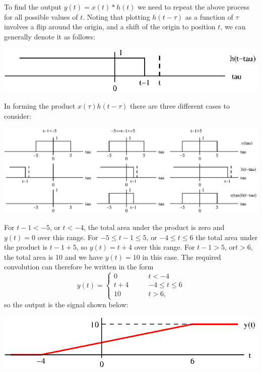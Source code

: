 \documentclass[10pt]{beamer}
\newcommand{\conv}{\ast}
\begin{document}
To find the output $y(t) = x(t) \conv h(t)$ we need to repeat the above process for all possible values of $t$.  Noting that plotting $h(t-\tau)$ as a function of $\tau$ involves a flip around the origin, and a shift of the origin to position $t$, we can generally denote it as follows:
\begin{center}
  \includegraphics{convexample4}
\end{center}
In forming the product $x(\tau) h(t-\tau)$ there are three different cases to consider:
\begin{center}
  \includegraphics{convexample3}
\end{center}
For $t-1<-5$, or $t<-4$, the total area under the product is zero and $y(t)=0$ over this range.  For $-5 \leq t-1 \leq 5$, or $-4 \leq t \leq 6$ the total area under the product is $t-1+5$, so $y(t) = t+4$ over this range.  For $t-1>5$, or$t>6$, the total area is 10 and we have $y(t)=10$ in this case.  The required convolution can therefore be written in the form
\begin{equation*}
  y(t) = \begin{cases}
    0 \qquad & t<-4 \\
    t+4 \qquad & -4 \leq t \leq 6 \\
    10 \qquad & t>6,
  \end{cases}
\end{equation*}
so the output is the signal shown below:
\begin{center}
  \includegraphics{convexample5}
\end{center}
\end{document}
